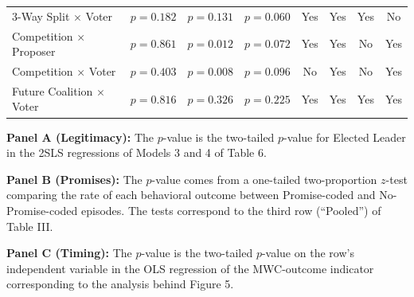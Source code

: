 \begin{landscape}
\begin{threeparttable}
\begin{tabular}{l@{\hskip 20pt} ccc @{\hskip 20pt} cc @{\hskip 20pt} cc}
3-Way Split $\times$ Voter & $p=0.182$ & $p=0.131$ & $p=0.060$ & Yes & Yes & Yes & No \\
Competition $\times$ Proposer & $p=0.861$ & $p=0.012$ & $p=0.072$ & Yes & Yes & No & Yes \\
Competition $\times$ Voter & $p=0.403$ & $p=0.008$ & $p=0.096$ & No & Yes & No & Yes \\
Future Coalition $\times$ Voter & $p=0.816$ & $p=0.326$ & $p=0.225$ & Yes & Yes & Yes & Yes \\
\bottomrule
\end{tabular}
\begin{tablenotes}[flushleft]
\footnotesize
\item \textbf{Panel A (Legitimacy):} The $p$-value is the two-tailed $p$-value for Elected Leader in the 2SLS regressions of Models 3 and 4 of Table 6.
\item \textbf{Panel B (Promises):} The $p$-value comes from a one-tailed two-proportion $z$-test comparing the rate of each behavioral outcome between Promise-coded and No-Promise-coded episodes. The tests correspond to the third row (\textquotedblleft Pooled\textquotedblright) of Table III.
\item \textbf{Panel C (Timing):} The $p$-value is the two-tailed $p$-value on the row's independent variable in the OLS regression of the MWC-outcome indicator corresponding to the analysis behind Figure 5.
\end{tablenotes}
\end{threeparttable}
\end{landscape}
